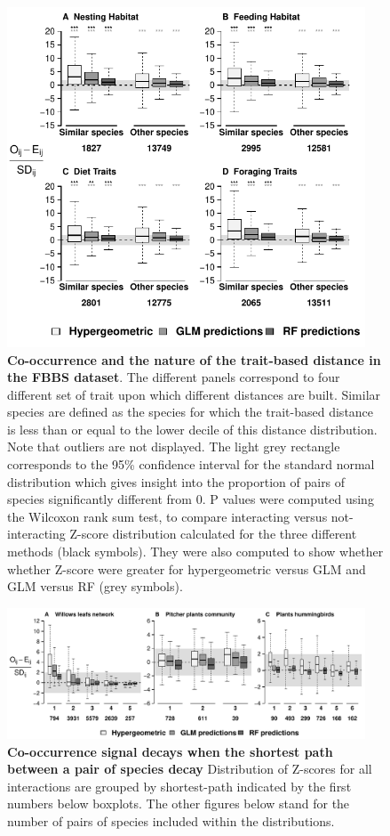 \begin{figure}
\centering
\includegraphics[width=0.95000\textwidth]{chapitre3/figS4.pdf}
\caption{\textbf{Co-occurrence and the nature of the trait-based
distance in the FBBS dataset}. The different panels correspond to four
different set of trait upon which different distances are built. Similar
species are defined as the species for which the trait-based distance is
less than or equal to the lower decile of this distance distribution.
Note that outliers are not displayed. The light grey rectangle
corresponds to the 95\% confidence interval for the standard normal
distribution which gives insight into the proportion of pairs of species
significantly different from 0. P values were computed using the
Wilcoxon rank sum test, to compare interacting versus not-interacting
Z-score distribution calculated for the three different methods (black
symbols). They were also computed to show whether whether Z-score were
greater for hypergeometric versus GLM and GLM versus RF (grey
symbols).\label{fig:dist}}
\end{figure}

\newpage

\begin{figure}
\centering
\includegraphics[width=0.95000\textwidth]{chapitre3/figS5.pdf}
\caption{\textbf{Co-occurrence signal decays when the shortest path
between a pair of species decay} Distribution of Z-scores for all
interactions are grouped by shortest-path indicated by the first numbers
below boxplots. The other figures below stand for the number of pairs of
species included within the distributions.\label{fig:sht_pth2}}
\end{figure}

